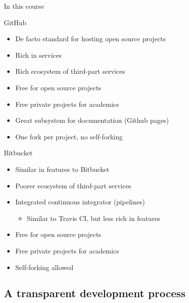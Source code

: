 \documentclass[presentation]{beamer}
\begin{document}
\begin{frame}[allowframebreaks]{In this course}
    \begin{block}{GitHub}
        \begin{itemize}
            \item De facto standard for hosting open source projects
            \item Rich in services
            \item Rich ecosystem of third-part services
            \item Free for open source projects
            \item Free private projects for academics
            \item Great subsystem for documentation (Github pages)
            \item One fork per project, no self-forking
        \end{itemize}
    \end{block}
    \begin{block}{Bitbucket}
        \begin{itemize}
            \item Similar in features to Bitbucket
            \item Poorer ecosystem of third-part services
            \item Integrated continuous integrator (pipelines)
            \begin{itemize}
                \item Similar to Travis CI, but less rich in features
            \end{itemize}
            \item Free for open source projects
            \item Free private projects for academics
            \item Self-forking allowed
        \end{itemize}
    \end{block}
\end{frame}

\subsection{A transparent development process}
\end{document}
